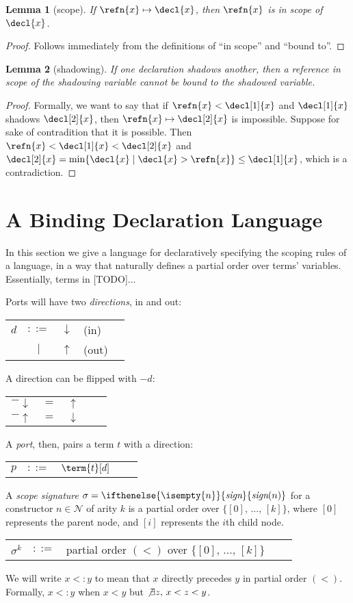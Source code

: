 \documentclass[preprint]{sigplanconf}
\makeatletter
\newenvironment{jtable}
  {\begin{center}\begin{tabular}{l c l @{\quad}l l}}
  {\end{tabular}\end{center}}
\theoremstyle{plain}
\newtheorem{lemma}{Lemma}
\newcommand{\ifempty}[3]{\ifthenelse{\isempty{#1}}{#2}{#3}}
\newcommand{\constr}[2]{\ifempty{#2}{#1}{#1(#2)}}
\newcommand{\constrit}[2]{\constr{\textit{#1}}{#2}}
\newcommand{\negport}[1]{-{#1}}
\newcommand{\im}{\downarrow}
\newcommand{\ex}{\uparrow}
\newcommand{\bound}{\mapsto}
\newcommand{\sign}[1]{\constrit{sign}{#1}}
\newcommand{\NotExists}[1]{\not\exists{#1},\,}
\makeatother
\begin{document}
\begin{lemma}[scope]
If $\refn{x} \bound \decl{x}$, then $\refn{x}$ is in scope of
$\decl{x}$.
\end{lemma}
\begin{proof}
Follows immediately from the definitions of ``in scope'' and
``bound to''.
\end{proof}

\begin{lemma}[shadowing]
If one declaration shadows another, then a reference in scope of the
shadowing variable cannot be bound to the shadowed variable.
\end{lemma}
\begin{proof}
Formally, we want to say that
if $\refn{x} < \decl[1]{x}$ and $\decl[1]{x}$ shadows $\decl[2]{x}$,
then $\refn{x} \bound \decl[2]{x}$ is impossible.
Suppose for sake of contradition that it is possible.
Then $\refn{x} < \decl[1]{x} < \decl[2]{x}$
and $\decl[2]{x} = \min \{\decl{x} \mid \decl{x} > \refn{x}\}
\le \decl[1]{x}$, which is a contradiction.

\end{proof}


\section{A Binding Declaration Language}

In this section we give a language for declaratively specifying the
scoping rules of a language, in a way that naturally defines a
partial order over terms' variables. Essentially, terms in [TODO]...

Ports will have two \emph{directions}, in and out:
\begin{jtable}
$d$ &$::=$& $\im$  & (in) \\
   &$\mid$& $\ex$ & (out)
\end{jtable}
A direction can be flipped with $\negport{d}$:
\begin{jtable}
$\negport{\im}$ &$=$& $\ex$ \\
$\negport{\ex}$ &$=$& $\im$
\end{jtable}
A \emph{port}, then, pairs a term $t$ with a direction:
\begin{jtable}
$p$ &$::=$& $\term{t}[d]$
\end{jtable}

A \emph{scope signature} $\sigma = \sign{n}$ for a constructor $n \in
\mathcal{N}$ of arity $k$ is a partial order over
$\{[0],\,...,\,[k]\}$, where $[0]$ represents the parent node, and
$[i]$ represents the $i$th child node.
\begin{jtable}
$\sigma^k$ &$::=$& partial order $(<)$ over
  $\{[0],\,...,\,[k]\}$
\end{jtable}
We will write $x <: y$ to mean that $x$ directly precedes $y$ in
partial order $(<)$.
Formally, $x <: y$ when $x < y$ but $\NotExists{z} x < z < y$.
\end{document}
